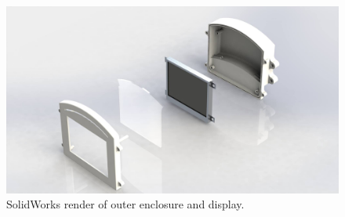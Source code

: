 \begin{figure}[H]
\begin{center}
\includegraphics[width=12cm]{Figures/device_render_expanded.jpg}
\end{center}
\caption{SolidWorks render of outer enclosure and display.}
\label{fig:device_render_expanded}
\end{figure}
